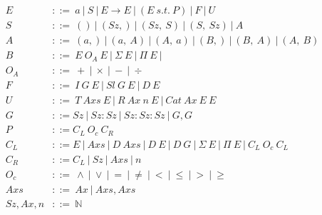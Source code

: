 \documentclass{article}
\begin{document}
\begin{align*}
  E &::=\ a\ |\ S\ |\ E \rightarrow E\ |\ (E\ s.t.\ P)\ |\ F\ |\ U\\
  S &::=\ ()\ |\ (Sz,)\ |\ (Sz,\ S)\ |\ (S,\ Sz)\ |\ A \\
  A &::=\ (a,)\ |\ (a,\ A)\ |\ (A,\ a)\ |\ (B,)\ |\ (B,\ A)\ |\ (A,\ B)\\
  B &::=\ E\ O_A\ E\ |\ \Sigma\ E\ |\ \Pi\ E\ | \\
  O_A &::=\ +\ |\ \times\ |\ -\ |\ \div \\
  F &::=\ I\ G\ E\ |\ Sl\ G\ E\ |\ D\ E\ \\
  U &::=\ T\ Axs\ E\ |\ R\ Ax\ n\ E\ |\ Cat\ Ax\ E\ E \\
  G &::= Sz\ |\ Sz:Sz\ |\ Sz:Sz:Sz\ |\ G,G\ \\
  P &::= C_L\ O_c\ C_R\\
  C_L &::= E\ |\ Axs\ |\ D\ Axs\ |\ D\ E\ |\ D\ G\ |\ \Sigma\ E\ |\ \Pi\ E\ |\ C_L\ O_c\ C_L \\
  C_R &::= C_L\ |\ Sz\ |\ Axs\ |\ n\\
  O_c &::=\ \wedge\ |\ \vee\ |\ =\ |\ \neq\ |\ <\ |\ \leq\ |\ >\ |\ \geq\\
  Axs &::=\ Ax\ |\ Axs, Axs \\
  Sz, Ax, n &::=\ \mathbb{N}
\end{align*}
\end{document}
